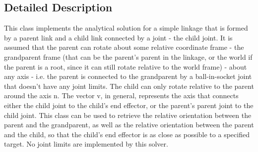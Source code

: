 \subsection{Detailed Description}
This class implements the analytical solution for a simple linkage that is formed by a parent link and a child link connected by a joint -\/ the child joint. It is assumed that the parent can rotate about some relative coordinate frame -\/ the grandparent frame (that can be the parent's parent in the linkage, or the world if the parent is a root, since it can still rotate relative to the world frame) -\/ about any axis -\/ i.e. the parent is connected to the grandparent by a ball-\/in-\/socket joint that doesn't have any joint limits. The child can only rotate relative to the parent around the axis n. The vector v, in general, represents the axis that connects either the child joint to the child's end effector, or the parent's parent joint to the child joint. This class can be used to retrieve the relative orientation between the parent and the grandparent, as well as the relative orientation between the parent and the child, so that the child's end effector is as close as possible to a specified target. No joint limits are implemented by this solver. 

